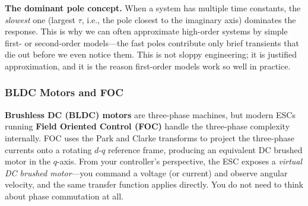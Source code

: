 \begin{mdframed}[linewidth=1pt, innertopmargin=10pt, innerbottommargin=10pt]
\textbf{The dominant pole concept.} When a system has multiple time constants, the \textit{slowest} one (largest $\tau$, i.e., the pole closest to the imaginary axis) dominates the response. This is why we can often approximate high-order systems by simple first- or second-order models---the fast poles contribute only brief transients that die out before we even notice them. This is not sloppy engineering; it is justified approximation, and it is the reason first-order models work so well in practice.
\end{mdframed}

\subsubsection*{BLDC Motors and FOC}

\textbf{Brushless DC (BLDC) motors} are three-phase machines, but modern ESCs running \textbf{Field Oriented Control (FOC)} handle the three-phase complexity internally. FOC uses the Park and Clarke transforms to project the three-phase currents onto a rotating $d$-$q$ reference frame, producing an equivalent DC brushed motor in the $q$-axis. From your controller's perspective, the ESC exposes a \emph{virtual DC brushed motor}---you command a voltage (or current) and observe angular velocity, and the same transfer function applies directly. You do not need to think about phase commutation at all.


